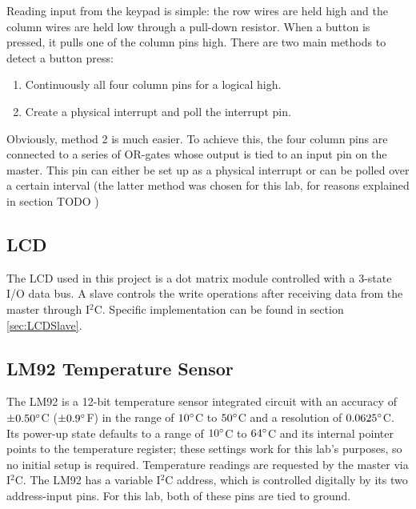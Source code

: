 \documentclass{article}
\begin{document}
\noindent Reading input from the keypad is simple: the row wires are held high and the column wires are held low through a pull-down resistor. When a button is pressed, it pulls one of the column pins high. There are two main methods to detect a button press:

\begin{enumerate}
	\item Continuously all four column pins for a logical high.
	\item Create a physical interrupt and poll the interrupt pin.
\end{enumerate}

\noindent Obviously, method 2 is much easier. To achieve this, the four column pins are connected to a series of OR-gates whose output is tied to an input pin on the master. This pin can either be set up as a physical interrupt or can be polled over a certain interval (the latter method was chosen for this lab, for reasons explained in section TODO )


\subsection{LCD}
\label{sec:LCD}

The LCD used in this project is a dot matrix module controlled with a 3-state I/O data bus. A slave controls the write operations after receiving data from the master through I\(^2\)C. Specific implementation can be found in section \ref{sec:LCDSlave}.\\


\subsection{LM92 Temperature Sensor}
\label{sec:LM92}

The LM92 is a 12-bit temperature sensor integrated circuit with an accuracy of \(\pm 0.50\degree\)C (\(\pm 0.9 \degree\)F) in the range of \(10 \degree\)C to \(50 \degree\)C and a resolution of \(0.0625 \degree\)C. Its power-up state defaults to a range of \(10 \degree\)C to \(64 \degree\)C and its internal pointer points to the temperature register; these settings work for this lab's purposes, so no initial setup is required. Temperature readings are requested by the master via I\(^2\)C. The LM92 has a variable I\(^2\)C address, which is controlled digitally by its two address-input pins. For this lab, both of these pins are tied to ground.\\
\end{document}
